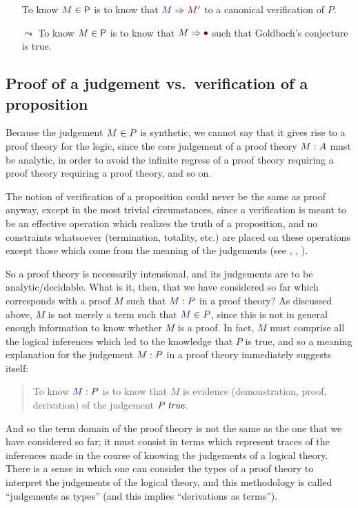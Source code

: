 \documentclass[main.tex]{subfiles}
\begin{document}
\begin{itemize}
  \item[] To know $\ver{M}{\mathsf{P}}$ is to know that $\reduce{M}{M'}$ to a
    canonical verification of $P$.
  \item[$\leadsto$] To know $\ver{M}{\mathsf{P}}$ is to know that
    $\reduce{M}{\bullet}$ such that Goldbach's conjecture is true.
\end{itemize}

\subsection{Proof of a judgement vs.\ verification of a proposition}

Because the judgement $\ver{M}{P}$ is synthetic, we cannot say that it
gives rise to a proof theory for the logic, since the core judgement
of a proof theory $\ofty{M}{A}$ must be analytic, in order to avoid the
infinite regress of a proof theory requiring a proof theory requiring
a proof theory, and so on.

The notion of verification of a proposition could never be the same as proof
anyway, except in the most trivial circumstances, since a verification is meant
to be an effective operation which realizes the truth of a proposition, and no
constraints whatsoever (termination, totality, etc.) are placed on these
operations except those which come from the meaning of the judgements (see
\cite{Dummett:Elements}, \cite{Prawitz12}, \cite{TroelstraA:conm}).

So a proof theory is necessarily intensional, and its judgements are to be
analytic/decidable. What is it, then, that we have considered so far which
corresponds with a proof $M$ such that $\ofty{M}{P}$ in a proof theory? As discussed
above, $M$ is not merely a term such that $\ver{M}{P}$, since this is not in
general enough information to know whether $M$ is a proof. In fact, $M$ must
comprise all the logical inferences which led to the knowledge that $P$ is
true, and so a meaning explanation for the judgement $\ofty{M}{P}$ in a proof theory
immediately suggests itself:
\begin{quote}
  To know $\ofty{M}{P}$ is to know that $M$ is evidence (demonstration, proof,
  derivation) of the judgement $\istrue{P}$.
\end{quote}

And so the term domain of the proof theory is not the same as the one that we
have considered so far; it must consist in terms which represent traces of the
inferences made in the course of knowing the judgements of a logical theory.
There is a sense in which one can consider the types of a proof theory to
interpret the judgements of the logical theory, and this methodology is called
``judgements as types'' (and this implies ``derivations as terms'').
\end{document}
